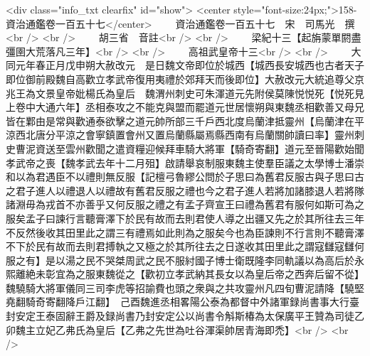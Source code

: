 <div class="info_txt clearfix" id="show">
<center style="font-size:24px;">158-資治通鑑卷一百五十七</center>
  　　資治通鑑卷一百五十七　宋　司馬光　撰<br />
<br />
　　胡三省　音註<br />
<br />
　　梁紀十三【起旃蒙單閼盡彊圉大荒落凡三年】<br />
<br />
　　高祖武皇帝十三<br />
<br />
　　大同元年春正月戊申朔大赦改元　是日魏文帝即位於城西【城西長安城西也古者天子即位御前殿魏自高歡立孝武帝復用夷禮於郊拜天而後即位】大赦改元大統追尊父京兆王為文景皇帝妣楊氏為皇后　魏渭州刺史可朱渾道元先附侯莫陳悦悦死【悦死見上卷中大通六年】丞相泰攻之不能克與盟而罷道元世居懷朔與東魏丞相歡善又母兄皆在鄴由是常與歡通泰欲擊之道元帥所部三千戶西北度烏蘭津抵靈州【烏蘭津在平涼西北唐分平涼之會寧鎮置會州又置烏蘭縣屬焉縣西南有烏蘭關帥讀曰率】靈州刺史曹泥資送至雲州歡聞之遣資糧迎候拜車騎大將軍【騎奇寄翻】道元至晉陽歡始聞孝武帝之喪【魏孝武去年十二月殂】啟請舉哀制服東魏主使羣臣議之太學博士潘崇和以為君遇臣不以禮則無反服【記檀弓魯繆公問於子思曰為舊君反服古與子思曰古之君子進人以禮退人以禮故有舊君反服之禮也今之君子進人若將加諸膝退人若將隊諸淵毋為戎首不亦善乎又何反服之禮之有孟子齊宣王曰禮為舊君有服何如斯可為之服矣孟子曰諫行言聽膏澤下於民有故而去則君使人導之出疆又先之於其所往去三年不反然後收其田里此之謂三有禮焉如此則為之服矣今也為臣諫則不行言則不聽膏澤不下於民有故而去則君搏執之又極之於其所往去之日遂收其田里此之謂寇讎寇讎何服之有】是以湯之民不哭桀周武之民不服紂國子博士衛既隆李同軌議以為高后於永熙離絶未彰宜為之服東魏從之【歡初立孝武納其長女以為皇后帝之西奔后留不從】　魏驍騎大將軍儀同三司李虎等招諭費也頭之衆與之共攻靈州凡四旬曹泥請降【驍堅堯翻騎奇寄翻降戶江翻】　己酉魏進丞相畧陽公泰為都督中外諸軍録尚書事大行臺封安定王泰固辭王爵及録尚書乃封安定公以尚書令斛斯椿為太保廣平王贊為司徒乙卯魏主立妃乙弗氏為皇后【乙弗之先世為吐谷渾渠帥居青海即禿】<br />
<br />
